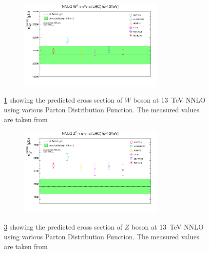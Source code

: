 \begin{figure}[H]
\centering
\begin{subfigure}{\textwidth}
\includegraphics[width=0.8\textwidth, height=0.4\textheight]{chapter4/W.png}
\vspace*{-4mm}
\caption{}
\label{WCSNNLO}
\end{subfigure}
\caption{\ref{WCSNNLO} showing the predicted cross section of $W$ boson at 13~TeV NNLO using various Parton Distribution Function. The measured values are taken from~\cite{Aad_2016}}
\label{WCSNNLO1}
\end{figure}

\begin{figure}[H]
\centering
\begin{subfigure}{\textwidth}
\includegraphics[width=0.8\textwidth, height=0.4\textheight]{chapter4/ZCs.png}
\vspace*{-6mm}
\caption{}
\label{ZCSNNLO}
\end{subfigure}
\caption{\ref{ZCSNNLO} showing the predicted cross section of $Z$ boson at 13~TeV NNLO using various Parton Distribution Function. The measured values are taken from~\cite{Aad_2016} }
\label{WZCS}
\end{figure}

